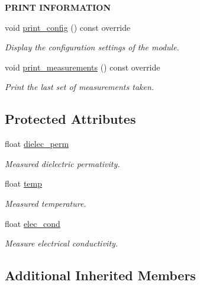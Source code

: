 \begin{Indent}{\bf P\+R\+I\+NT I\+N\+F\+O\+R\+M\+A\+T\+I\+ON}\par
\begin{DoxyCompactItemize}
\item 
void \hyperlink{class_loom___decagon_g_s3_a398d5f2c572ae06bc31870fea1ca3e68}{print\+\_\+config} () const override
\begin{DoxyCompactList}\small\item\em Display the configuration settings of the module. \end{DoxyCompactList}\item 
void \hyperlink{class_loom___decagon_g_s3_a070ed45daa73857fd8fafbb0f7bd27a3}{print\+\_\+measurements} () const override
\begin{DoxyCompactList}\small\item\em Print the last set of measurements taken. \end{DoxyCompactList}\end{DoxyCompactItemize}
\end{Indent}
\subsection*{Protected Attributes}
\begin{DoxyCompactItemize}
\item 
float \hyperlink{class_loom___decagon_g_s3_a4d980a6c88cf7eeed2594c1651a439dd}{dielec\+\_\+perm}
\begin{DoxyCompactList}\small\item\em Measured dielectric permativity. \end{DoxyCompactList}\item 
float \hyperlink{class_loom___decagon_g_s3_a24b5b1b72e6754add3768d4596832026}{temp}
\begin{DoxyCompactList}\small\item\em Measured temperature. \end{DoxyCompactList}\item 
float \hyperlink{class_loom___decagon_g_s3_a707a1d557e8b5eaa55202b45d369a350}{elec\+\_\+cond}
\begin{DoxyCompactList}\small\item\em Measure electrical conductivity. \end{DoxyCompactList}\end{DoxyCompactItemize}
\subsection*{Additional Inherited Members}


